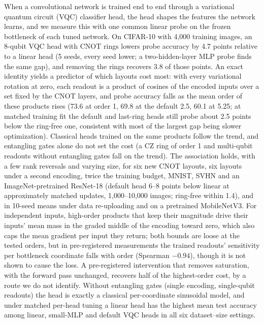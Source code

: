 When a convolutional network is trained end to end through a variational quantum circuit
(VQC) classifier head, the head shapes the features the network learns, and we measure this
with one common linear probe on the frozen bottleneck of each tuned network. On CIFAR-10
with 4,000 training images, an 8-qubit VQC head with CNOT rings lowers probe accuracy by 4.7
points relative to a linear head (5 seeds, every seed lower; a two-hidden-layer MLP probe finds the
same gap), and removing the rings recovers 3.8 of those points. An exact identity yields a predictor of which layouts cost most: with every variational rotation
at zero, each readout is a product of cosines of the encoded inputs over a set fixed by the
CNOT layers, and probe accuracy falls as the mean order of these products rises (73.6 at
order 1, 69.8 at the default 2.5, 60.1 at 5.25; at matched training fit the default and last-ring heads still probe about 2.5 points below the ring-free one, consistent with most of the largest gap being slower optimization). Classical heads trained on the same products follow the trend, and entangling gates alone do not set the cost (a CZ ring of order 1 and multi-qubit readouts without entangling gates fall on the trend).
The association holds, with a few rank reversals and varying size, for six new CNOT layouts, six layouts under a second encoding, twice the training budget, MNIST, SVHN and an ImageNet-pretrained ResNet-18 (default head 6--8 points below linear at approximately matched updates, 1,000--10,000 images; ring-free within 1.4), and in 10-seed means under data re-uploading and on a pretrained MobileNetV3.
For independent inputs, high-order products that keep their magnitude drive their inputs' mean mass in the graded middle of the encoding toward zero, which also caps the mean gradient per input they return; both bounds are loose at the tested orders, but in pre-registered measurements the trained readouts' sensitivity per bottleneck coordinate falls with order (Spearman $-0.94$), though it is not shown to cause the loss. A pre-registered
intervention that removes saturation, with the forward pass unchanged, recovers half of
the highest-order cost, by a route we do not identify. Without entangling gates (single encoding, single-qubit readouts) the head is exactly a classical per-coordinate sinusoidal model, and under matched per-head tuning a linear head has the highest mean test
accuracy among linear, small-MLP and default VQC heads in all six dataset--size settings.
